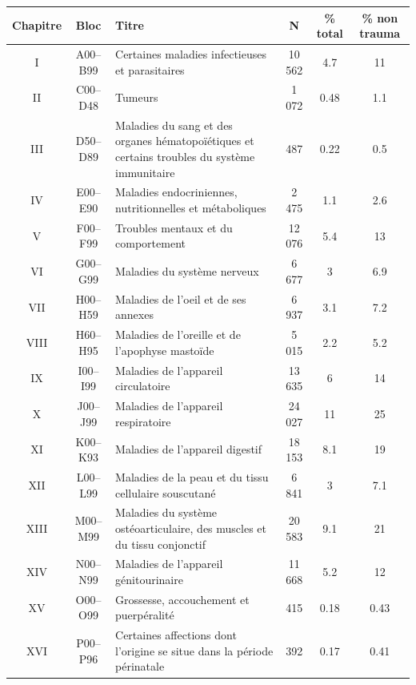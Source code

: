 \documentclass[12pt,english,french,twoside]{book}\usepackage[]{graphicx}\usepackage[]{color}
\begin{document}
\begin{longtable}{|c|c|m{4cm}|c|c|c|}
 \hline
 Chapitre & Bloc & Titre & N & \% total  & \% non trauma \\
 \hline
 
I & A00–B99 & Certaines maladies infectieuses et parasitaires & 10 562 & 4.7 & 11 \\
 II&C00–D48&Tumeurs&1 072&0.48&1.1\\
 
III&D50–D89&Maladies du sang et des organes hématopoïétiques et certains troubles du système immunitaire&487&0.22&0.5\\

IV&E00–E90&Maladies endocriniennes, nutritionnelles et métaboliques&2 475&1.1&2.6\\

V&F00–F99&Troubles mentaux et du comportement&12 076&5.4&13\\

VI&G00–G99&Maladies du système nerveux&6 677&3&6.9\\

VII & H00–H59 & Maladies de l'oeil et de ses annexes & 6 937 & 3.1&7.2\\

VIII&H60–H95&Maladies de l'oreille et de l'apophyse mastoïde&5 015&2.2&5.2\\

IX&I00–I99&Maladies de l'appareil circulatoire&13 635&6&14\\

X&J00–J99&Maladies de l'appareil respiratoire&24 027&11&25\\

XI&K00–K93&Maladies de l'appareil digestif&18 153&8.1&19\\

XII&L00–L99&Maladies de la peau et du tissu cellulaire souscutané&6 841&3&7.1\\

XIII&M00–M99&Maladies du système ostéoarticulaire, des muscles et du tissu conjonctif&20 583&9.1&21\\

XIV&N00–N99&Maladies de l'appareil génitourinaire&11 668&5.2&12\\

XV&O00–O99&Grossesse, accouchement et puerpéralité&415&0.18&0.43\\

XVI&P00–P96&Certaines affections dont l'origine se situe dans la période périnatale&392&0.17&0.41\\


\end{longtable}
\end{document}
